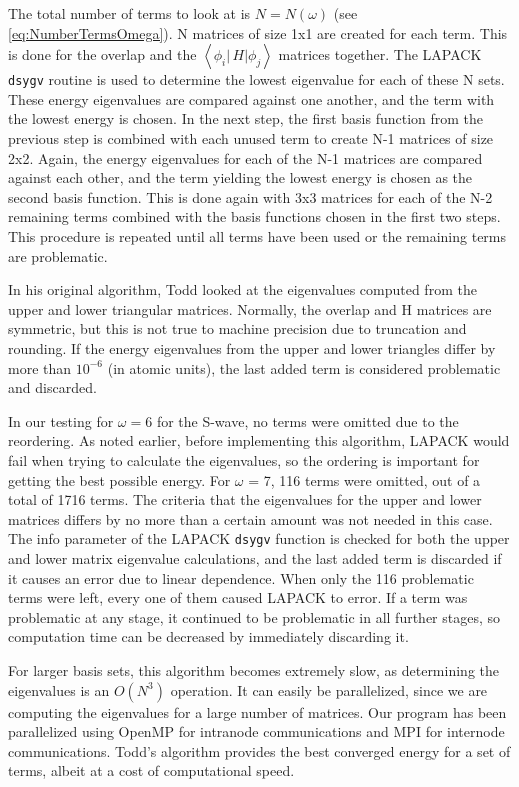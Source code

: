 \documentclass[Dissertation.tex]{subfiles}
\begin{document}
The total number of terms to look at is $N = N(\omega)$ (see \cref{eq:NumberTermsOmega}).
N matrices of size 1x1 are created for each term. This 
is done for the overlap and the
$\left\langle \phi_i \left| \,H \right| \phi_j \right\rangle$
matrices together. The LAPACK \texttt{dsygv} routine is used to 
determine the lowest eigenvalue for each of these N sets. These energy 
eigenvalues are compared against one another, and the term with the lowest 
energy is chosen. In the next step, the first basis function from the 
previous step is combined with each unused term to create N-1 matrices of 
size 2x2. Again, the energy eigenvalues for each of the N-1 matrices are 
compared against each other, and the term yielding the lowest energy is 
chosen as the second basis function. This is done again with 3x3 matrices for 
each of the N-2 remaining terms combined with the basis functions chosen in 
the first two steps. This procedure is repeated until all terms have been 
used or the remaining terms are problematic.

In his original algorithm, Todd looked at the eigenvalues computed from 
the upper and lower triangular matrices. Normally, the overlap and H matrices 
are symmetric, but this is not true to machine precision due to truncation 
and rounding. If the energy eigenvalues from the upper and lower triangles 
differ by more than $10^{-6}$ (in atomic units), the last added term is 
considered problematic and discarded.

In our testing for $\omega = 6$ for the S-wave, no terms were omitted due to the reordering. 
As noted earlier, before implementing this algorithm, LAPACK would fail when 
trying to calculate the eigenvalues, so the ordering is important for getting 
the best possible energy. For $\omega$ = 7, 116 terms were omitted, out of a 
total of 1716 terms. The criteria that the eigenvalues for the upper and 
lower matrices differs by no more than a certain amount was not needed in 
this case. The info parameter of the LAPACK \texttt{dsygv} function is checked for 
both the upper and lower matrix eigenvalue calculations, and the last added 
term is discarded if it causes an error due to linear dependence. When only 
the 116 problematic terms were left, every one of them caused LAPACK to 
error. If a term was problematic at any stage, it continued to be problematic 
in all further stages, so computation time can be decreased by immediately 
discarding it.

For larger basis sets, this algorithm becomes extremely slow, as determining 
the eigenvalues is an $O(N^3)$ operation. It can easily be parallelized, 
since we are computing the eigenvalues for a large number of matrices. Our 
program has been parallelized using OpenMP \cite{OpenMP} for intranode
communications and MPI \cite{MPI} for internode communications. Todd's
algorithm provides the best converged energy for a set of terms, albeit
at a cost of computational speed.
\end{document}
